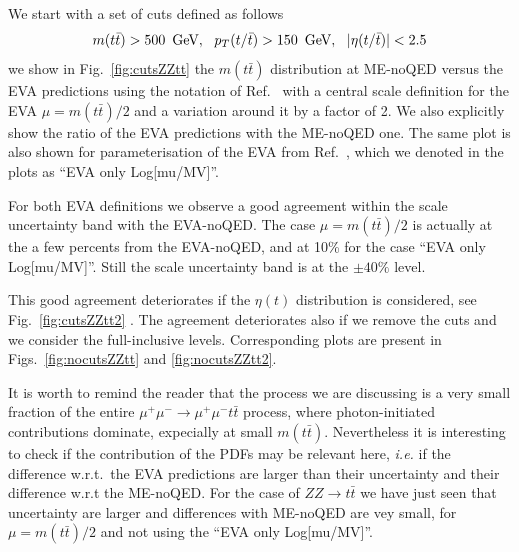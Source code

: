 \documentclass[a4paper,11pt]{article}
\begin{document}
We start with a set of cuts defined as follows
%
\begin{equation}
m(t \bar t) > 500~\,\textrm{GeV},~~ p_T(t/ \bar t) > 150~\,\textrm{GeV},~~ |\eta(t/\bar t)|<2.5 
\end{equation}
%
we show in Fig.~\ref{fig:cutsZZtt} the $m(t \bar t)$ distribution at ME-noQED versus the EVA predictions using the notation of Ref.~\cite{Garosi:2023bvq} with a central scale definition for the EVA $\mu=m(t \bar t) /2$ and a variation around it by a factor of 2.
We also explicitly  show the ratio of the EVA predictions with the ME-noQED one. The same plot is also shown for parameterisation of the EVA from Ref.~\cite{Ruiz:2021tdt}, which we denoted in the plots as ``EVA only Log[mu/MV]''.

For both EVA definitions we observe a good agreement within the scale uncertainty band with the EVA-noQED. The case $\mu=m(t \bar t)/2$ is actually at the a few percents from the  EVA-noQED, and at 10\% for the case  ``EVA only Log[mu/MV]''. Still the scale uncertainty band is at the $\pm40\%$ level.

This good agreement deteriorates if the $\eta(t)$ distribution is considered, see Fig.~\ref{fig:cutsZZtt2} .  
The agreement deteriorates also if we remove the cuts and we consider the full-inclusive levels. Corresponding plots are present in Figs.~\ref{fig:nocutsZZtt} and \ref{fig:nocutsZZtt2}. 

It is worth to remind the reader that the process we are discussing is a very small fraction of the entire $\mu^+\mu^-\to\mu^+\mu^- t \bar t$ process, where photon-initiated contributions dominate, expecially at small $m(t \bar t)$. Nevertheless it is interesting to check if the contribution of the PDFs may be relevant here, {\it i.e.} if the difference w.r.t.~the EVA predictions are larger than their uncertainty and their difference w.r.t the ME-noQED. For the case of $ZZ\to t \bar t$ we have just seen that uncertainty are larger and differences with   ME-noQED are vey small, for $\mu=m(t \bar t) /2$ and not using the ``EVA only Log[mu/MV]''.



 
\end{document}
